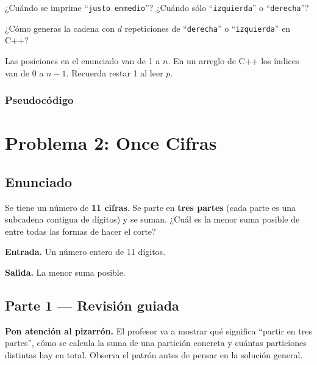 \documentclass[12pt, oneside]{article}
\begin{document}
\vspace{2.5cm}

¿Cuándo se imprime ``\texttt{justo enmedio}''?  ¿Cuándo sólo
``\texttt{izquierda}'' o ``\texttt{derecha}''?

\vspace{2cm}

¿Cómo generas la cadena con $d$ repeticiones de
``\texttt{derecha}'' o ``\texttt{izquierda}'' en C++?

\vspace{2cm}

\begin{recuerda}
  Las posiciones en el enunciado van de 1 a $n$.  En un arreglo de C++
  los índices van de 0 a $n-1$.  Recuerda restar 1 al leer $p$.
\end{recuerda}

\subsubsection{Pseudocódigo}

\vspace{5cm}

\newpage

\section{Problema 2: Once Cifras}

\subsection{Enunciado}

Se tiene un número de \textbf{11 cifras}.  Se parte en \textbf{tres
partes} (cada parte es una subcadena contigua de dígitos) y se suman.
¿Cuál es la menor suma posible de entre todas las formas de hacer
el corte?

\textbf{Entrada.}
Un número entero de 11 dígitos.

\textbf{Salida.}
La menor suma posible.

\subsection{Parte 1 — Revisión guiada}

\begin{advertencia}
  \textbf{Pon atención al pizarrón.}  El profesor va a mostrar qué
  significa ``partir en tres partes'', cómo se calcula la suma de
  una partición concreta y cuántas particiones distintas hay en total.
  Observa el patrón antes de pensar en la solución general.
\end{advertencia}
\end{document}
